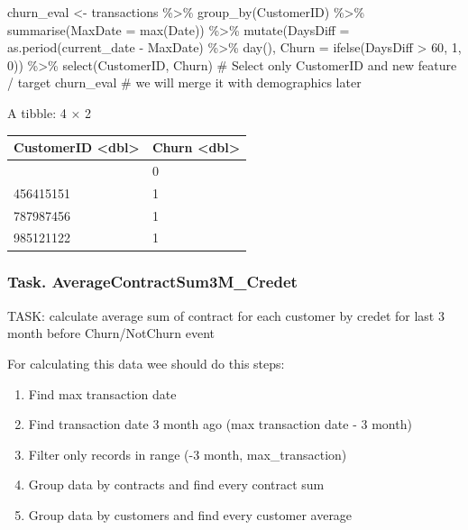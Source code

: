 \documentclass[
  letterpaper,
  DIV=11,
  numbers=noendperiod]{scrreprt}
\newenvironment{Shaded}{\begin{snugshade}}{\end{snugshade}}
\newcommand{\AttributeTok}[1]{\textcolor[rgb]{0.40,0.45,0.13}{#1}}
\newcommand{\CommentTok}[1]{\textcolor[rgb]{0.37,0.37,0.37}{#1}}
\newcommand{\DecValTok}[1]{\textcolor[rgb]{0.68,0.00,0.00}{#1}}
\newcommand{\FunctionTok}[1]{\textcolor[rgb]{0.28,0.35,0.67}{#1}}
\newcommand{\NormalTok}[1]{\textcolor[rgb]{0.00,0.23,0.31}{#1}}
\newcommand{\OtherTok}[1]{\textcolor[rgb]{0.00,0.23,0.31}{#1}}
\newcommand{\SpecialCharTok}[1]{\textcolor[rgb]{0.37,0.37,0.37}{#1}}
\providecommand{\tightlist}{%
  \setlength{\itemsep}{0pt}\setlength{\parskip}{0pt}}\usepackage{longtable,booktabs,array}
\begin{document}
\begin{Shaded}
\begin{Highlighting}[]
\NormalTok{churn\_eval }\OtherTok{\textless{}{-}}\NormalTok{ transactions }\SpecialCharTok{\%\textgreater{}\%}
        \FunctionTok{group\_by}\NormalTok{(CustomerID) }\SpecialCharTok{\%\textgreater{}\%}
        \FunctionTok{summarise}\NormalTok{(}\AttributeTok{MaxDate =} \FunctionTok{max}\NormalTok{(Date)) }\SpecialCharTok{\%\textgreater{}\%}
        \FunctionTok{mutate}\NormalTok{(}\AttributeTok{DaysDiff =} \FunctionTok{as.period}\NormalTok{(current\_date }\SpecialCharTok{{-}}\NormalTok{ MaxDate) }\SpecialCharTok{\%\textgreater{}\%} \FunctionTok{day}\NormalTok{(),}
               \AttributeTok{Churn =} \FunctionTok{ifelse}\NormalTok{(DaysDiff }\SpecialCharTok{\textgreater{}} \DecValTok{60}\NormalTok{, }\DecValTok{1}\NormalTok{, }\DecValTok{0}\NormalTok{)) }\SpecialCharTok{\%\textgreater{}\%}
        \FunctionTok{select}\NormalTok{(CustomerID, Churn) }\CommentTok{\# Select only CustomerID and new feature / target}
\NormalTok{churn\_eval }\CommentTok{\# we will merge it with demographics later}
\end{Highlighting}
\end{Shaded}

A tibble: 4 × 2

\begin{longtable}[]{@{}ll@{}}
\toprule\noalign{}
CustomerID \textless dbl\textgreater{} & Churn
\textless dbl\textgreater{} \\
\midrule\noalign{}
\endhead
\bottomrule\noalign{}
\endlastfoot
215454555 & 0 \\
456415151 & 1 \\
787987456 & 1 \\
985121122 & 1 \\
\end{longtable}

\subsubsection{Task.
AverageContractSum3M\_Credet}\label{task.-averagecontractsum3m_credet}

TASK: calculate average sum of contract for each customer by credet for
last 3 month before Churn/NotChurn event

For calculating this data wee should do this steps:

\begin{enumerate}
\def\labelenumi{\arabic{enumi}.}
\tightlist
\item
  Find max transaction date
\item
  Find transaction date 3 month ago (max transaction date - 3 month)
\item
  Filter only records in range (-3 month, max\_transaction)
\item
  Group data by contracts and find every contract sum
\item
  Group data by customers and find every customer average
\end{enumerate}
\end{document}
